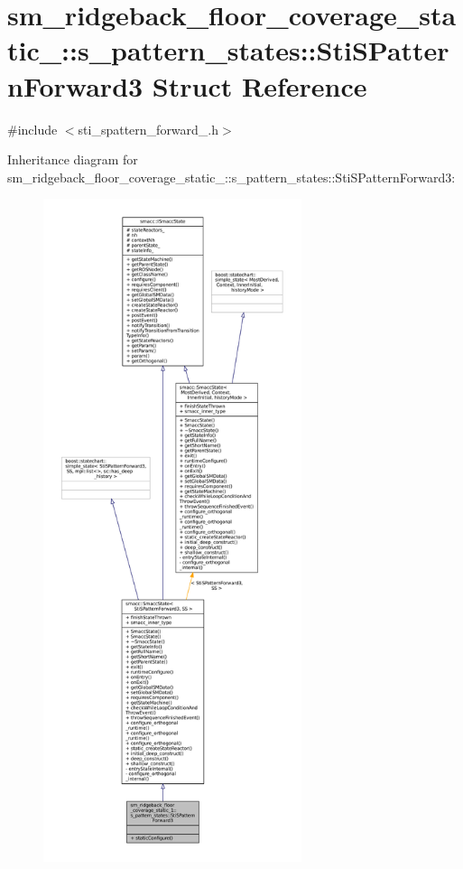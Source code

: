 \hypertarget{structsm__ridgeback__floor__coverage__static__1_1_1s__pattern__states_1_1StiSPatternForward3}{}\section{sm\+\_\+ridgeback\+\_\+floor\+\_\+coverage\+\_\+static\+\_\+:\+:s\+\_\+pattern\+\_\+states\+:\+:Sti\+S\+Pattern\+Forward3 Struct Reference}
\label{structsm__ridgeback__floor__coverage__static__1_1_1s__pattern__states_1_1StiSPatternForward3}


{\ttfamily \#include $<$sti\+\_\+spattern\+\_\+forward\+\_.\+h$>$}



Inheritance diagram for sm\+\_\+ridgeback\+\_\+floor\+\_\+coverage\+\_\+static\+\_\+:\+:s\+\_\+pattern\+\_\+states\+:\+:Sti\+S\+Pattern\+Forward3\+:
\nopagebreak
\begin{figure}[H]
\begin{center}
\leavevmode
\includegraphics[height=550pt]{structsm__ridgeback__floor__coverage__static__1_1_1s__pattern__states_1_1StiSPatternForward3__inherit__graph}
\end{center}
\end{figure}


